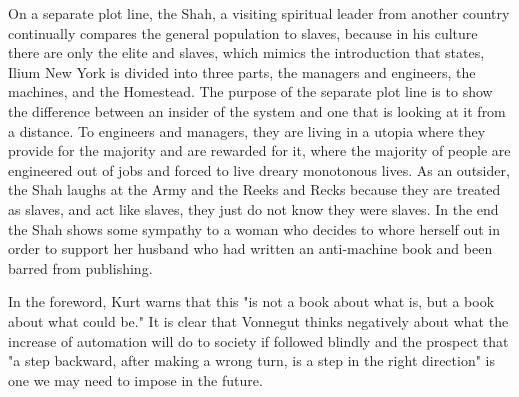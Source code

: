 On a separate plot line, the Shah, a visiting spiritual leader from another country continually compares the general population to slaves, because in his culture there are only the elite and slaves, which mimics the introduction that states, Ilium New York is divided into three parts, the managers and engineers, the machines, and the Homestead.
The purpose of the separate plot line is to show the difference between an insider of the system and one that is looking at it from a distance.
To engineers and managers, they are living in a utopia where they provide for the majority and are rewarded for it, where the majority of people are engineered out of jobs and forced to live dreary monotonous lives.
As an outsider, the Shah laughs at the Army and the Reeks and Recks because they are treated as slaves, and act like slaves, they just do not know they were slaves.
In the end the Shah shows some sympathy to a woman who decides to whore herself out in order to support her husband who had written an anti-machine book and been barred from publishing.

In the foreword, Kurt warns that this "is not a book about what is, but a book about what could be." \autocite[11]{kurt1}
It is clear that Vonnegut thinks negatively about what the increase of automation will do to society if followed blindly and the prospect that "a step backward, after making a wrong turn, is a step in the right direction" \autocite[190]{kurt1} is one we may need to impose in the future.